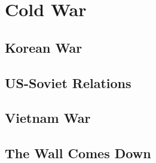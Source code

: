 \chapter{Cold War}

\section{Korean War}

\section{US-Soviet Relations}

\section{Vietnam War}

\section{The Wall Comes Down}

